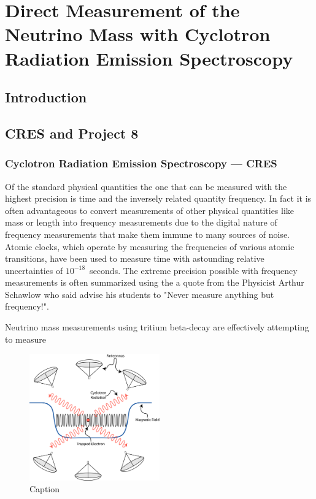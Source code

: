 
\chapter{Direct Measurement of the Neutrino Mass with Cyclotron Radiation Emission Spectroscopy}

\section{Introduction}

\section{CRES and Project 8}

\subsection{Cyclotron Radiation Emission Spectroscopy --- CRES}

Of the standard physical quantities the one that can be measured with the highest precision is time and the inversely related quantity frequency. In fact it is often advantageous to convert measurements of other physical quantities like mass or length into frequency measurements due to the digital nature of frequency measurements that make them immune to many sources of noise. Atomic clocks, which operate by measuring the frequencies of various atomic transitions, have been used to measure time with astounding relative uncertainties of $10^{-18}$~seconds. The extreme precision possible with frequency measurements is often summarized using the a quote from the Physicist Arthur Schawlow who said advise his students to "Never measure anything but frequency!". 

Neutrino mass measurements using tritium beta-decay are effectively attempting to measure  

\begin{figure}[htbp]
    \centering
    \includegraphics[width=0.5\textwidth]{figs/Chapter-3/230303_cres_cartoon.png}
    \caption{Caption}
    \label{fig:cres_cartoon}
\end{figure}

